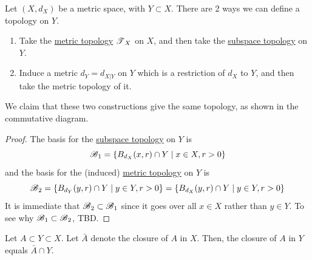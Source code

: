   \begin{theorem}
    \label{thm:topologies-on-subspaces-of-metric-spaces}
    Let $(X, d_X)$ be a metric space, with $Y \subset X$. There are 2 ways we can define a topology on $Y$. 
    \begin{enumerate}
      \item Take the \hyperref[def:metric-topology]{metric topology} $\operatorname{\mathscr{T}}_X$ on $X$, and then take the \hyperref[def:subspace-topology]{subspace topology} on $Y$. 
      \item Induce a metric $d_Y = d_{X | Y}$ on $Y$ which is a restriction of $d_X$ to $Y$, and then take the metric topology of it. 
    \end{enumerate}
    We claim that these two constructions give the same topology, as shown in the commutative diagram. 

    \begin{figure}[H]
      \centering 
      \caption{} 
      \label{fig:same_construction}
    \end{figure}
  \end{theorem}
  \begin{proof}
    The basis for the \hyperref[def:subspace-topology]{subspace topology} on $Y$ is 
    \begin{equation}
      \operatorname{\mathscr{B}}_1 = \{B_{d_X} (x, r) \cap Y \mid x \in X, r > 0 \}
    \end{equation} 
    and the basis for the (induced) \hyperref[def:metric-topology]{metric topology} on $Y$ is 
    \begin{equation}
      \operatorname{\mathscr{B}}_2 = \{B_{d_Y} (y, r) \cap Y \mid y \in Y, r > 0 \} = \{B_{d_X} (y, r) \cap Y \mid y \in Y, r > 0 \}
    \end{equation} 
    It is immediate that $\operatorname{\mathscr{B}}_2 \subset \operatorname{\mathscr{B}}_1$ since it goes over all $x \in X$ rather than $y \in Y$. To see why $\operatorname{\mathscr{B}}_1 \subset \operatorname{\mathscr{B}}_2$, TBD. 
  \end{proof}

  \begin{theorem}
    \label{thm:closures-in-subspace-topologies}
    Let $A \subset Y \subset X$. Let $\bar{A}$ denote the closure of $A$ in $X$. Then, the closure of $A$ in $Y$ equals $\bar{A} \cap Y$. 
  \end{theorem}

